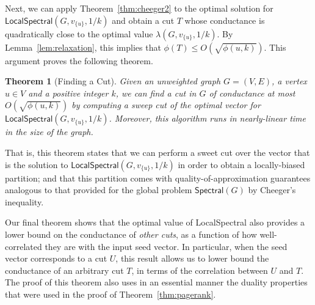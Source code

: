 \documentclass[11pt]{article}
\newtheorem{theorem}{Theorem}
\begin{document}
\noindent
Next, we can apply Theorem~\ref{thm:cheeger2} to the optimal solution for 
$\textsf{LocalSpectral}(G,v_{\{u\}},1/k)$ and obtain a cut $T$ whose 
conductance is quadratically close to the optimal value 
$\lambda(G,v_{\{u\}},1/k)$. 
By Lemma~\ref{lem:relaxation}, this implies that 
$\phi(T) \leq O(\sqrt{\phi(u,k)})$.
This argument proves the following theorem.
\begin{theorem}[Finding a Cut]
\label{thm:cut} 
Given an unweighted graph $G=(V,E)$, a vertex $u \in V$ and a positive 
integer $k$, we can find a cut in $G$ of conductance at most 
$O(\sqrt{ \phi(u,k)})$ by computing a sweep cut of the optimal vector for 
$\textsf{LocalSpectral}(G, v_{\{u\}},1/k)$. 
Moreover, this algorithm runs in nearly-linear time in the size of the graph.
\end{theorem}

\noindent
That is, this theorem states that we can perform a sweet cut over the vector 
that is the solution to $\textsf{LocalSpectral}(G,v_{\{u\}},1/k)$ in order 
to obtain a locally-biased partition; and that this partition comes with 
quality-of-approximation guarantees analogous to that provided for the 
global problem $\textsf{Spectral}(G)$ by Cheeger's inequality.

Our final theorem shows that the optimal value of \textsf{LocalSpectral}
also provides a lower bound on the conductance of \emph{other cuts}, as a function 
of how well-correlated they are with the input seed vector.
In particular, when the seed vector corresponds to a cut $U$, this result
allows us to lower bound the conductance of an arbitrary cut $T$, in terms
of the correlation between $U$ and $T$.
The proof of this theorem 
also uses in an essential manner the
duality properties that were used in the 
proof of Theorem~\ref{thm:pagerank}.
\end{document}
